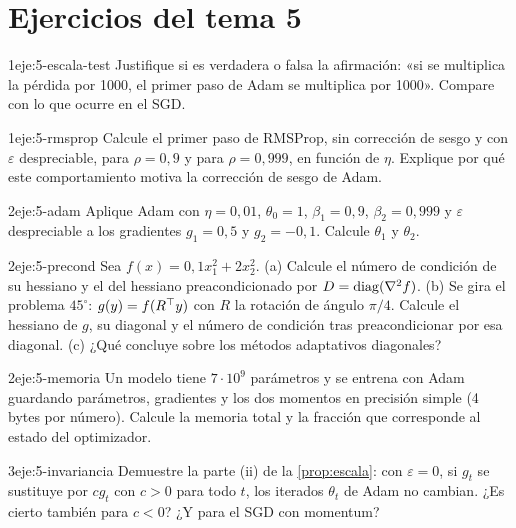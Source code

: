 \section*{Ejercicios del tema 5}

\begin{ejercicio}{1}{eje:5-escala-test}
Justifique si es verdadera o falsa la afirmación: «si se multiplica la pérdida por 1000, el primer paso de Adam se multiplica por 1000». Compare con lo que ocurre en el SGD.
\end{ejercicio}

\begin{ejercicio}{1}{eje:5-rmsprop}
Calcule el primer paso de RMSProp, sin corrección de sesgo y con $\varepsilon$ despreciable, para $\rho=0{,}9$ y para $\rho=0{,}999$, en función de $\eta$. Explique por qué este comportamiento motiva la corrección de sesgo de Adam.
\end{ejercicio}

\begin{ejercicio}{2}{eje:5-adam}
Aplique Adam con $\eta=0{,}01$, $\theta_0=1$, $\beta_1=0{,}9$, $\beta_2=0{,}999$ y $\varepsilon$ despreciable a los gradientes $g_1=0{,}5$ y $g_2=-0{,}1$. Calcule $\theta_1$ y $\theta_2$.
\end{ejercicio}

\begin{ejercicio}{2}{eje:5-precond}
Sea $f(x)=0{,}1x_1^{2}+2x_2^{2}$. (a) Calcule el número de condición de su hessiano y el del hessiano preacondicionado por $D=\operatorname{diag}(\nabla^{2}f)$. (b) Se gira el problema $45^{\circ}$: $g(y)=f(R^{\top} y)$ con $R$ la rotación de ángulo $\pi/4$. Calcule el hessiano de $g$, su diagonal y el número de condición tras preacondicionar por esa diagonal. (c) ¿Qué concluye sobre los métodos adaptativos diagonales?
\end{ejercicio}

\begin{ejercicio}{2}{eje:5-memoria}
Un modelo tiene $7\cdot 10^{9}$ parámetros y se entrena con Adam guardando parámetros, gradientes y los dos momentos en precisión simple (4 bytes por número). Calcule la memoria total y la fracción que corresponde al estado del optimizador.
\end{ejercicio}

\begin{ejercicio}{3}{eje:5-invariancia}
Demuestre la parte (ii) de la \cref{prop:escala}: con $\varepsilon=0$, si $g_t$ se sustituye por $cg_t$ con $c>0$ para todo $t$, los iterados $\theta_t$ de Adam no cambian. ¿Es cierto también para $c<0$? ¿Y para el SGD con momentum?
\end{ejercicio}

